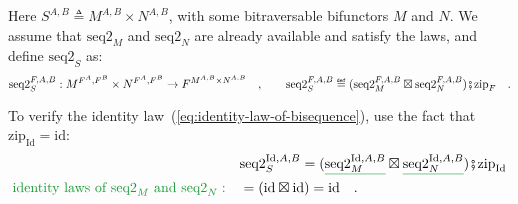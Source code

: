 Here $S^{A,B}\triangleq M^{A,B}\times N^{A,B}$, with some bitraversable
bifunctors $M$ and $N$. We assume that $\text{seq2}_{M}$ and $\text{seq2}_{N}$
are already available and satisfy the laws, and define $\text{seq2}_{S}$
as:
\[
\text{seq2}_{S}^{F,A,B}:M^{F^{A},F^{B}}\times N^{F^{A},F^{B}}\rightarrow F^{M^{A,B}\times N^{A,B}}\quad,\quad\quad\text{seq2}_{S}^{F,A,B}\triangleq(\text{seq2}_{M}^{F,A,B}\boxtimes\text{seq2}_{N}^{F,A,B})\bef\text{zip}_{F}\quad.
\]

To verify the identity law~(\ref{eq:identity-law-of-bisequence}),
use the fact that $\text{zip}_{\text{Id}}=\text{id}$:
\begin{align*}
 & \text{seq2}_{S}^{\text{Id},A,B}=(\gunderline{\text{seq2}_{M}^{\text{Id},A,B}}\boxtimes\gunderline{\text{seq2}_{N}^{\text{Id},A,B}})\bef\text{zip}_{\text{Id}}\\
{\color{greenunder}\text{identity laws of }\text{seq2}_{M}\text{ and }\text{seq2}_{N}:}\quad & =(\text{id}\boxtimes\text{id})=\text{id}\quad.
\end{align*}

